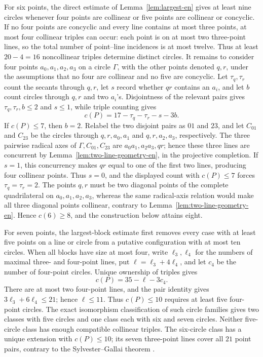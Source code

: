 \documentclass[11pt,a4paper]{article}
\theoremstyle{definition}
\begin{document}
For six points, the direct estimate of Lemma~\ref{lem:largest-en} gives at least
nine circles whenever four points are collinear or five points are collinear or
concyclic.  If no four points are concyclic and every line contains at most three
points, at most four collinear triples can occur: each point is on at most two
three-point lines, so the total number of point--line incidences is at most twelve.
Thus at least $20-4=16$ noncollinear triples determine distinct circles.  It remains
to consider four points $a_0,a_1,a_2,a_3$ on a circle $\Gamma$, with the other
points denoted $q,r$, under the assumptions that no four are collinear and no five
are concyclic.  Let $\tau_q,\tau_r$ count the secants through $q,r$, let $s$ record
whether $qr$ contains an $a_i$, and let $b$ count circles through $q,r$ and two
$a_i$'s.  Disjointness of the relevant pairs gives
$\tau_q,\tau_r,b\le2$ and $s\le1$, while triple counting gives
\[
c(P)=17-\tau_q-\tau_r-s-3b.
\]
If $c(P)\le7$, then $b=2$.  Relabel the two disjoint pairs as $01$ and $23$,
and let $C_{01}$ and $C_{23}$ be the circles through
$q,r,a_0,a_1$ and $q,r,a_2,a_3$, respectively.  The three pairwise radical
axes of $\Gamma,C_{01},C_{23}$ are $a_0a_1,a_2a_3,qr$; hence these three
lines are concurrent by Lemma~\ref{lem:two-line-geometry-en}, in the projective
completion.  If $s=1$, this concurrency makes $qr$ equal to one of the first two
lines, producing four collinear points.  Thus $s=0$, and the displayed count with
$c(P)\le7$ forces $\tau_q=\tau_r=2$.  The points $q,r$ must be two diagonal points of the complete
quadrilateral on $a_0,a_1,a_2,a_3$, whereas the same radical-axis relation would
make all three diagonal points collinear, contrary to
Lemma~\ref{lem:two-line-geometry-en}.  Hence $c(6)\ge8$,
and the construction below attains eight.

For seven points, the largest-block estimate first removes every case with at least
five points on a line or circle from a putative configuration with at most ten
circles.  When all blocks have size at most four, write $\ell_3,\ell_4$ for the
numbers of maximal three- and four-point lines, put
$\ell=\ell_3+4\ell_4$, and let $c_4$ be the number of four-point circles.  Unique
ownership of triples gives
\[
c(P)=35-\ell-3c_4.
\]
There are at most two four-point lines, and the pair identity gives
$3\ell_3+6\ell_4\le21$; hence $\ell\le11$.  Thus $c(P)\le10$ requires at least
five four-point circles.  The exact isomorphism classification of such circle
families gives two classes with five circles and one class each with six and seven
circles.  Neither five-circle class has enough compatible collinear triples.  The
six-circle class has a unique extension with $c(P)\le10$; its seven three-point
lines cover all $21$ point pairs, contrary to the Sylvester--Gallai theorem
\cite[pp.~111--112]{borwein-moser-en}.
\end{document}
